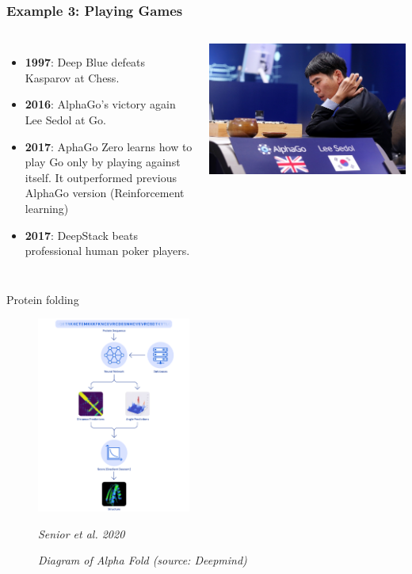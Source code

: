 \documentclass[handout, 10pt]{beamer}
\newcommand{\rref}[1][]{\hfill{\scriptsize\textit{#1}}}
\begin{document}
\begin{frame}
\frametitle{Example 3: Playing Games}
\begin{columns}
\begin{itemize}
\item {\bf 1997}: Deep Blue defeats Kasparov at Chess.
\item {\bf 2016}: AlphaGo's victory again Lee Sedol at Go.
\item {\bf 2017}: AphaGo Zero learns how to play Go only by playing against
  itself. It outperformed previous AlphaGo version (Reinforcement
  learning)
\item {\bf 2017}: DeepStack beats professional human poker players.
\end{itemize}
\includegraphics[width=\textwidth]{./fig/L1/alphago.jpg}
\end{columns}
\end{frame}

\begin{frame}{Protein folding}
  \begin{figure}
        \centering
        \includegraphics[width=0.45\textwidth]{fig/AlphaFold-Blog-9c_diagram2.png}
        \caption*{{\footnotesize \textit {Diagram of Alpha Fold (source: Deepmind)}}}
        \rref[Senior et al. 2020]
    \end{figure}
\end{frame}
\end{document}
